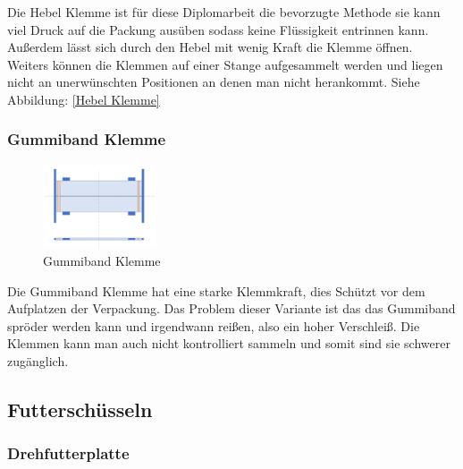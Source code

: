 Die Hebel Klemme ist für diese Diplomarbeit die bevorzugte Methode sie kann viel Druck auf die Packung ausüben sodass keine Flüssigkeit entrinnen kann. Außerdem lässt sich durch den Hebel mit wenig Kraft die Klemme öffnen. Weiters können die Klemmen auf einer Stange aufgesammelt werden und liegen nicht an unerwünschten Positionen an denen man nicht herankommt. Siehe Abbildung:    
 \ref{Hebel Klemme}
\vspace{+40pt}

\subsubsection{Gummiband Klemme}
 
\begin{figure}
\vspace{-40pt}
  \begin{center}
    \includegraphics[width=0.30\textwidth]{Bilder/Powerpoint/Gummiband_Klemme}
  \end{center}
  \caption{Gummiband Klemme}
  \label{Gummiband Klemme}
  \vspace{-20pt}
\end{figure}

Die Gummiband Klemme hat eine starke Klemmkraft, dies Schützt vor dem Aufplatzen der Verpackung. Das Problem dieser Variante ist das das Gummiband spröder werden kann und irgendwann reißen, also ein hoher Verschleiß. Die Klemmen kann man auch nicht kontrolliert sammeln und somit sind sie schwerer zugänglich.

\subsection{Futterschüsseln}

\subsubsection{Drehfutterplatte}

